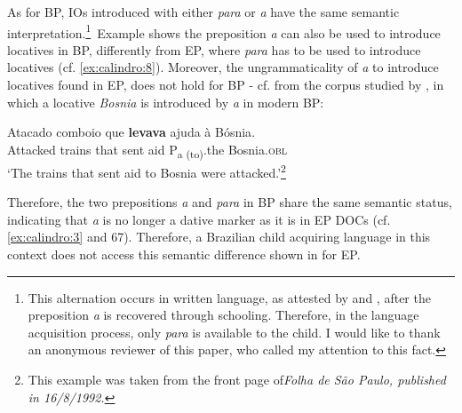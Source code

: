 \documentclass[output=paper,colorlinks,citecolor=brown,nonflat]{./langscibook}
\begin{document}
As for BP, IOs introduced with either \textit{para} or \textit{a} have the same semantic interpretation.\footnote{This alternation occurs in written language, as attested by \citet{Kato2005} and \citet{Calindro2015}, after the preposition \textit{a} is recovered through schooling. Therefore, in the language acquisition process, only \textit{para} is available to the child. I would like to thank an anonymous reviewer of this paper, who called my attention to this fact.}~Example  shows the preposition \textit{a} can also be used to introduce locatives in BP, differently from EP, where \textit{para} has to be used to introduce locatives (cf. \ref{ex:calindro:8}). Moreover, the ungrammaticality of \textit{a} to introduce locatives found in EP, does not hold for BP -  cf.  from the corpus studied by \citet[115]{Calindro2015}, in which a locative \textit{Bosnia} is introduced by \textit{a} in modern BP:

\ea%
    \label{ex:calindro:14}
    \gll Atacado   comboio que \textbf{levava}   ajuda  {à} {Bósnia}.\\
    Attacked  trains       that sent      aid      P{\textsubscript{a (to)}}.the {Bosnia.\textsc{obl}}\\
    \glt ‘The trains that sent aid  to Bosnia were attacked.’\footnote{This example was taken from the front page of\textit{Folha de São Paulo, published in 16/8/1992.}} 
    \z

Therefore, the two prepositions \textit{a} and \textit{para} in BP share the same semantic status, indicating that \textit{a} is no longer a dative marker as it is in EP DOCs (cf. \ref{ex:calindro:3} and 67). Therefore, a Brazilian child acquiring language in this context does not access this semantic difference shown in  for EP.
\end{document}
